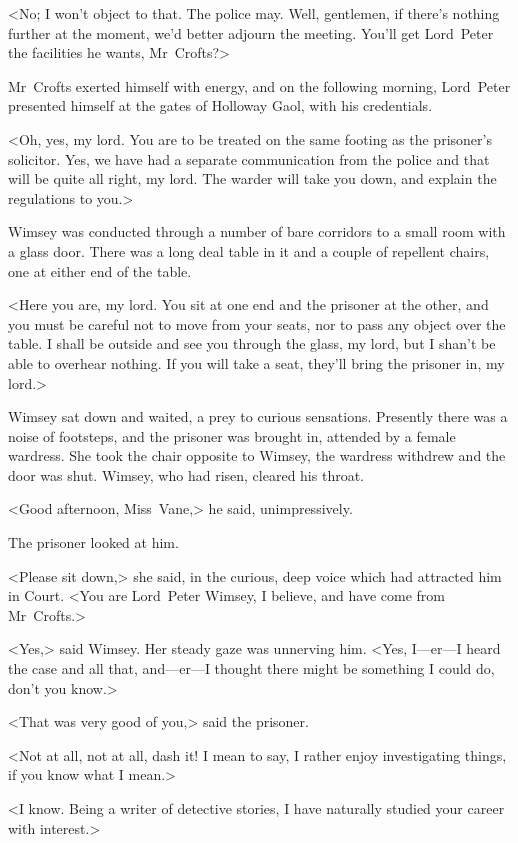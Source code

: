 <No; I won't object to that. The police may. Well, gentlemen, if there's nothing further at the moment, we'd better adjourn the meeting. You'll get Lord~Peter the facilities he wants, Mr~Crofts?>

\divider

Mr~Crofts exerted himself with energy, and on the following morning, Lord~Peter presented himself at the gates of Holloway Gaol, with his credentials.

<Oh, yes, my lord. You are to be treated on the same footing as the prisoner's solicitor. Yes, we have had a separate communication from the police and that will be quite all right, my lord. The warder will take you down, and explain the regulations to you.>

Wimsey was conducted through a number of bare corridors to a small room with a glass door. There was a long deal table in it and a couple of repellent chairs, one at either end of the table.

<Here you are, my lord. You sit at one end and the prisoner at the other, and you must be careful not to move from your seats, nor to pass any object over the table. I shall be outside and see you through the glass, my lord, but I shan't be able to overhear nothing. If you will take a seat, they'll bring the prisoner in, my lord.>

Wimsey sat down and waited, a prey to curious sensations. Presently there was a noise of footsteps, and the prisoner was brought in, attended by a female wardress. She took the chair opposite to Wimsey, the wardress withdrew and the door was shut. Wimsey, who had risen, cleared his throat.

<Good afternoon, Miss~Vane,> he said, unimpressively.

The prisoner looked at him.

<Please sit down,> she said, in the curious, deep voice which had attracted him in Court. <You are Lord~Peter Wimsey, I believe, and have come from Mr~Crofts.>

<Yes,> said Wimsey. Her steady gaze was unnerving him. <Yes, I—er—I heard the case and all that, and—er—I thought there might be something I could do, don't you know.>

<That was very good of you,> said the prisoner.

<Not at all, not at all, dash it! I mean to say, I rather enjoy investigating things, if you know what I mean.>

<I know. Being a writer of detective stories, I have naturally studied your career with interest.>

